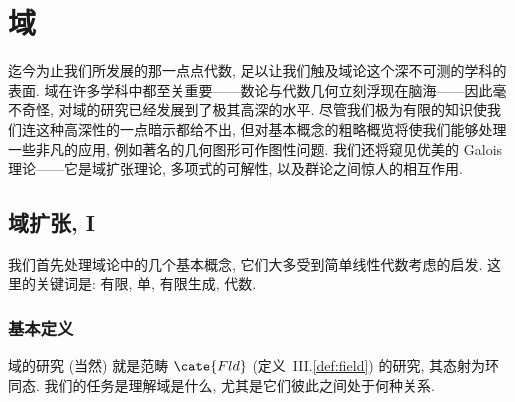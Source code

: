 
\chapter{域}
\label{chap:fields}


迄今为止我们所发展的那一点点代数, 足以让我们触及域论这个深不可测的学科的表面. 域在许多学科中都至关重要——数论与代数几何立刻浮现在脑海——因此毫不奇怪, 对域的研究已经发展到了极其高深的水平. 尽管我们极为有限的知识使我们连这种高深性的一点暗示都给不出, 但对基本概念的粗略概览将使我们能够处理一些非凡的应用, 例如著名的几何图形可作图性问题. 我们还将窥见优美的 Galois 理论——它是域扩张理论, 多项式的可解性, 以及群论之间惊人的相互作用.

\section{域扩张, I}
\label{sec:field-extensions-1}

我们首先处理域论中的几个基本概念, 它们大多受到简单线性代数考虑的启发. 这里的关键词是: 有限, 单, 有限生成, 代数.

\subsection{基本定义}
\label{subsec:basic-defs}

域的研究 (当然) 就是范畴 $\cate{Fld}$ (定义~III.\ref{def:field}) 的研究, 其态射为环同态. 我们的任务是理解域是什么, 尤其是它们彼此之间处于何种关系.

